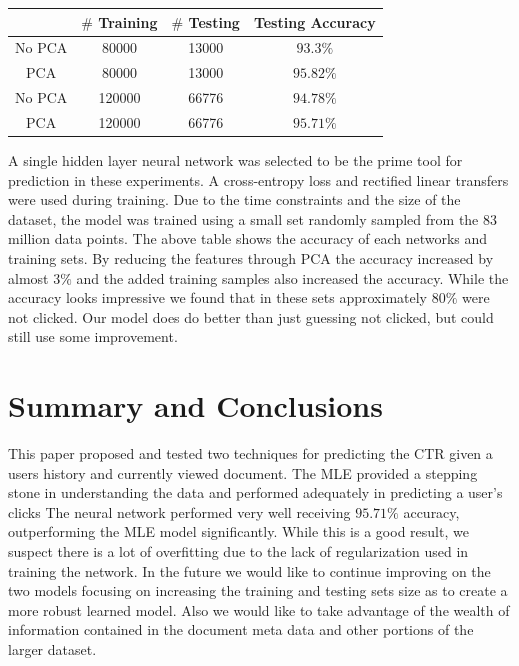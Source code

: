 \documentclass[fleqn,10pt]{SelfArx} %
\begin{document}
\begin{center}
\begin{tabular}{c|ccc}
 &$\#$ Training&$\#$ Testing&Testing Accuracy \\\hline\hline
No PCA  & 80000  & 13000 & $93.3\%$ \\
PCA   & 80000 & 13000 & $95.82\%$\\
No PCA   & 120000 & 66776 &  $94.78\%$\\
PCA  & 120000  & 66776 & $95.71\%$\\
\end{tabular}
\end{center}


A single hidden layer neural network was selected to be the prime tool for prediction in these experiments. A cross-entropy loss and rectified linear transfers were used during training.
Due to the time constraints and the size of the dataset, the model was trained using a small set randomly sampled from the 83 million data points.  The above table shows the accuracy of 
each networks and training sets. By reducing the features through PCA the accuracy increased by almost $3\%$ and the added training samples also increased the accuracy. While the accuracy
looks impressive we found that in these sets approximately $80\%$ were not clicked. Our model does do better than just guessing not clicked, but could still use some improvement.



\section{Summary and Conclusions}

This paper proposed and tested two techniques for predicting the CTR given a users history and currently viewed document. The MLE provided a stepping stone in understanding the data
and performed adequately in predicting a user's clicks The neural network performed very well receiving $95.71\%$ accuracy, outperforming the MLE model significantly. While this is a 
good result, we suspect there is a lot of overfitting due to the lack of regularization used in training the network. In the future we would like to continue improving on the two models 
focusing on increasing the training and testing sets size as to create a more robust learned model. Also we would like to take advantage of the wealth of information contained in the 
document meta data and other portions of the larger dataset.
\end{document}

